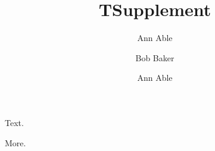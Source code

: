 \documentclass[aps,prl]{revtex4-2}
\begin{document}
\title{T}
\author{Ann Able}
\author{Bob Baker}
\maketitle
{}
Text.
\clearpage
\title{Supplement}
\author{Ann Able}
\maketitle
More.
\end{document}
